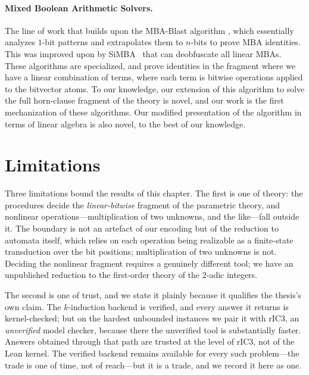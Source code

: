 \paragraph{Mixed Boolean Arithmetic Solvers.}
The line of work that builds upon the MBA-Blast algorithm \cite{liu2021mba},
which essentially analyzes $1$-bit patterns and extrapolates them to $n$-bits to prove MBA identities.
This was improved upon by SiMBA~\cite{reichenwallner2022efficient} that can deobfuscate all linear MBAs.
These algorithms are specialized, and prove identities in the fragment where we have a linear combination of terms,
where each term is bitwise operations applied to the bitvector atoms.
To our knowledge, our extension of this algorithm to solve the full horn-clause fragment of the theory is novel,
and our work is the first mechanization of these algorithms.
Our modified presentation of the algorithm in terms of linear algebra is also novel, to the best of our knowledge.

\section{Limitations}
\label{sec:mono:limitations}

Three limitations bound the results of this chapter. The first is one of theory:
the procedures decide the \emph{linear-bitwise} fragment of the parametric
theory, and nonlinear operations---multiplication of two unknowns, and the
like---fall outside it. The boundary is not an artefact of our encoding but of
the reduction to automata itself, which relies on each operation being realizable
as a finite-state transduction over the bit positions; multiplication of two
unknowns is not. Deciding the nonlinear fragment requires a genuinely different
tool; we have an unpublished reduction to the first-order theory of the $2$-adic
integers.

The second is one of trust, and we state it plainly because it qualifies the
thesis's own claim. The $k$-induction backend is verified, and every answer it
returns is kernel-checked; but on the hardest unbounded instances we pair it with
rIC3, an \emph{unverified} model checker, because there the unverified tool is
substantially faster. Answers obtained through that path are trusted at the level
of rIC3, not of the Lean kernel. The verified backend remains available for every
such problem---the trade is one of time, not of reach---but it is a trade, and
we record it here as one.

